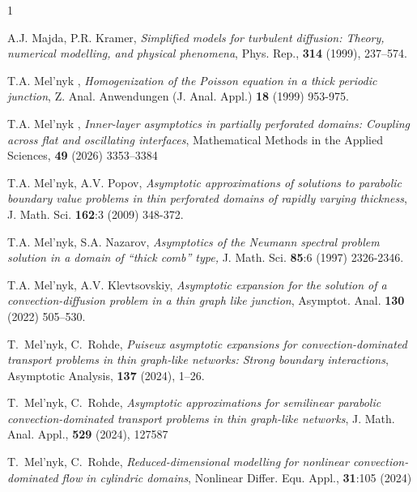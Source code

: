 \documentclass[reqno]{amsart}            %
\numberwithin{equation}{section}
\begin{document}
\begin{thebibliography}{1}
		
		A.J. Majda, P.R. Kramer, \textit{Simplified models for turbulent diffusion: Theory, numerical
			modelling, and physical phenomena}, Phys. Rep., \textbf{314} (1999),  237--574.
		
		T.A. Mel'nyk , \textit{Homogenization of the Poisson equation in a thick periodic junction},  Z. Anal. Anwendungen (J. Anal. Appl.)
		\textbf{18} (1999) 953-975.
		
		T.A. Mel'nyk , \textit{Inner-layer asymptotics in partially perforated domains: Coupling across flat and oscillating interfaces}, 
		Mathematical Methods in the Applied Sciences, \textbf{49} (2026) 3353–3384
		
		T.A. Mel’nyk,  A.V. Popov, 
		\textit{Asymptotic approximations of solutions to parabolic boundary value problems in thin perforated domains of rapidly varying thickness}, J. Math. Sci. \textbf{162}:3 (2009) 348-372. %
		
		
		
		T.A. Mel'nyk, S.A. Nazarov,  \textit{ Asymptotics of the Neumann spectral problem solution in a domain of  “thick comb” type,}  J. Math. Sci. \textbf{85}:6 (1997) 2326-2346.
		
		T.A. Mel’nyk, A.V. Klevtsovskiy, \textit{Asymptotic expansion for the solution of a convection-diffusion problem in a thin graph
			like junction}, Asymptot. Anal. \textbf{130}  (2022) 505–530. 
		
		
		T.~Mel'nyk,  C.~Rohde, \textit{Puiseux asymptotic expansions for convection-dominated transport problems in
			thin graph-like networks: Strong boundary interactions},   Asymptotic  Analysis,  \textbf{137} (2024), 1--26.
		
		
		T.~Mel'nyk,  C.~Rohde, \textit{Asymptotic approximations for semilinear parabolic convection-dominated transport problems in thin graph-like networks}, J. Math.  Anal. Appl., \textbf{529} (2024), 127587
		
		T.~Mel'nyk,  C.~Rohde, \textit{ Reduced-dimensional modelling for nonlinear convection-dominated flow in cylindric domains},
		Nonlinear Differ. Equ. Appl., \textbf{31}:105 (2024) %
		

\end{thebibliography}
\end{document}
